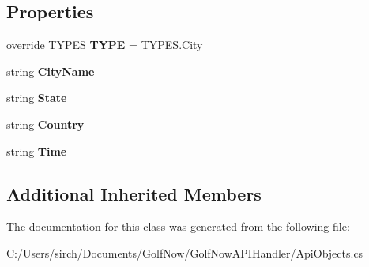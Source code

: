 \subsection*{Properties}
\begin{DoxyCompactItemize}
\item 
\mbox{\label{class_golf_now_a_p_i_1_1_tees_by_city_args_ae3e01a7e6e68110be3feecbb41c20dc2}} 
override T\+Y\+P\+ES {\bfseries T\+Y\+PE} = T\+Y\+P\+E\+S.\+City
\item 
\mbox{\label{class_golf_now_a_p_i_1_1_tees_by_city_args_abd0267bb70a1aad05a2dad16444e55ab}} 
string {\bfseries City\+Name}
\item 
\mbox{\label{class_golf_now_a_p_i_1_1_tees_by_city_args_a10d828ad9a2cff81e752603339e59d39}} 
string {\bfseries State}
\item 
\mbox{\label{class_golf_now_a_p_i_1_1_tees_by_city_args_a0ef7c494c26af12c2f8952a01ed7d138}} 
string {\bfseries Country}
\item 
\mbox{\label{class_golf_now_a_p_i_1_1_tees_by_city_args_a25e749f3b30e7d3da98371a99d3b1a87}} 
string {\bfseries Time}
\end{DoxyCompactItemize}
\subsection*{Additional Inherited Members}


The documentation for this class was generated from the following file\+:\begin{DoxyCompactItemize}
\item 
C\+:/\+Users/sirch/\+Documents/\+Golf\+Now/\+Golf\+Now\+A\+P\+I\+Handler/Api\+Objects.\+cs\end{DoxyCompactItemize}
